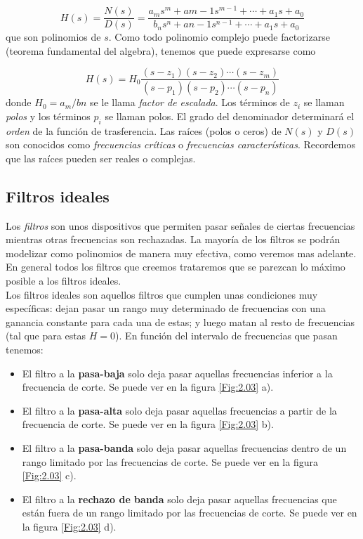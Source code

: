 \documentclass[12pt,a4paper]{article}
\numberwithin{equation}{section}
\numberwithin{figure}{section}
\begin{document}
\begin{equation}
H(s) = \dfrac{N(s)}{D(s)} = \dfrac{a_m s^m + a{m-1} s^{m-1} + \cdots + a_1 s + a_0}{b_n s^n + a{n-1} s^{n-1} + \cdots + a_1 s + a_0}
\end{equation}
que son polinomios de $s$. Como todo polinomio complejo puede factorizarse (teorema fundamental del algebra), tenemos que puede expresarse como

\begin{equation}
H(s) = H_0 \dfrac{(s-z_1)(s-z_2)\cdots(s-z_m)}{(s-p_1)(s-p_2)\cdots (s-p_n)}
\end{equation}
donde $H_0 = a_m / bn$ se le llama \textit{factor de escalada}. Los términos de $z_i$ se llaman \textit{polos} y los términos $p_i$ se llaman polos. El grado del denominador determinará el \textit{orden} de la función de trasferencia. Las raíces (polos o ceros) de $N(s)$ y $D(s)$ son conocidos como \textit{frecuencias críticas} o \textit{frecuencias características}. Recordemos que las raíces pueden ser reales o complejas. 


\subsection{Filtros ideales}

Los \textit{filtros} son unos dispositivos que permiten pasar señales de ciertas frecuencias mientras otras frecuencias son rechazadas. La mayoría de los filtros se podrán modelizar como polinomios de manera muy efectiva, como veremos mas adelante. En general todos los filtros que creemos trataremos que se parezcan lo máximo posible a los filtros ideales. \\

Los filtros ideales son aquellos filtros que cumplen unas condiciones muy específicas: dejan pasar un rango muy determinado de frecuencias con una ganancia constante para cada una de estas; y luego matan al resto de frecuencias (tal que para estas $H=0$). En función del intervalo de frecuencias que pasan tenemos:

\begin{itemize}
\item El filtro a la \textbf{pasa-baja} solo deja pasar aquellas frecuencias inferior a la frecuencia de corte. Se puede ver en la figura \ref{Fig:2.03} a).
\item El filtro a la \textbf{pasa-alta} solo deja pasar aquellas frecuencias a partir de la frecuencia de corte. Se puede ver en la figura \ref{Fig:2.03} b).
\item El filtro a la \textbf{pasa-banda} solo deja pasar aquellas frecuencias dentro de un rango limitado por las frecuencias de corte. Se puede ver en la figura \ref{Fig:2.03} c).
\item El filtro a la \textbf{rechazo de banda} solo deja pasar aquellas frecuencias que están fuera de un rango limitado por las frecuencias de corte. Se puede ver en la figura \ref{Fig:2.03} d).
\end{itemize}
\end{document}
